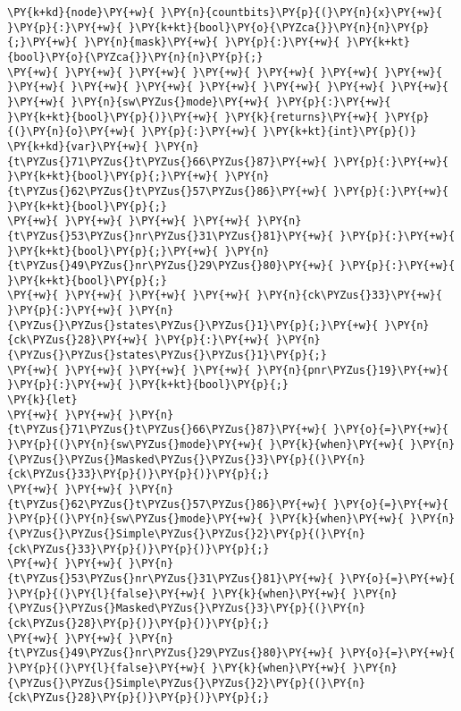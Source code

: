 \begin{Verbatim}[commandchars=\\\{\}]
\PY{k+kd}{node}\PY{+w}{ }\PY{n}{countbits}\PY{p}{(}\PY{n}{x}\PY{+w}{ }\PY{p}{:}\PY{+w}{ }\PY{k+kt}{bool}\PY{o}{\PYZca{}}\PY{n}{n}\PY{p}{;}\PY{+w}{ }\PY{n}{mask}\PY{+w}{ }\PY{p}{:}\PY{+w}{ }\PY{k+kt}{bool}\PY{o}{\PYZca{}}\PY{n}{n}\PY{p}{;}
\PY{+w}{ }\PY{+w}{ }\PY{+w}{ }\PY{+w}{ }\PY{+w}{ }\PY{+w}{ }\PY{+w}{ }\PY{+w}{ }\PY{+w}{ }\PY{+w}{ }\PY{+w}{ }\PY{+w}{ }\PY{+w}{ }\PY{+w}{ }\PY{+w}{ }\PY{n}{sw\PYZus{}mode}\PY{+w}{ }\PY{p}{:}\PY{+w}{ }\PY{k+kt}{bool}\PY{p}{)}\PY{+w}{ }\PY{k}{returns}\PY{+w}{ }\PY{p}{(}\PY{n}{o}\PY{+w}{ }\PY{p}{:}\PY{+w}{ }\PY{k+kt}{int}\PY{p}{)}
\PY{k+kd}{var}\PY{+w}{ }\PY{n}{t\PYZus{}71\PYZus{}t\PYZus{}66\PYZus{}87}\PY{+w}{ }\PY{p}{:}\PY{+w}{ }\PY{k+kt}{bool}\PY{p}{;}\PY{+w}{ }\PY{n}{t\PYZus{}62\PYZus{}t\PYZus{}57\PYZus{}86}\PY{+w}{ }\PY{p}{:}\PY{+w}{ }\PY{k+kt}{bool}\PY{p}{;}
\PY{+w}{ }\PY{+w}{ }\PY{+w}{ }\PY{+w}{ }\PY{n}{t\PYZus{}53\PYZus{}nr\PYZus{}31\PYZus{}81}\PY{+w}{ }\PY{p}{:}\PY{+w}{ }\PY{k+kt}{bool}\PY{p}{;}\PY{+w}{ }\PY{n}{t\PYZus{}49\PYZus{}nr\PYZus{}29\PYZus{}80}\PY{+w}{ }\PY{p}{:}\PY{+w}{ }\PY{k+kt}{bool}\PY{p}{;}
\PY{+w}{ }\PY{+w}{ }\PY{+w}{ }\PY{+w}{ }\PY{n}{ck\PYZus{}33}\PY{+w}{ }\PY{p}{:}\PY{+w}{ }\PY{n}{\PYZus{}\PYZus{}states\PYZus{}\PYZus{}1}\PY{p}{;}\PY{+w}{ }\PY{n}{ck\PYZus{}28}\PY{+w}{ }\PY{p}{:}\PY{+w}{ }\PY{n}{\PYZus{}\PYZus{}states\PYZus{}\PYZus{}1}\PY{p}{;}
\PY{+w}{ }\PY{+w}{ }\PY{+w}{ }\PY{+w}{ }\PY{n}{pnr\PYZus{}19}\PY{+w}{ }\PY{p}{:}\PY{+w}{ }\PY{k+kt}{bool}\PY{p}{;}
\PY{k}{let}
\PY{+w}{ }\PY{+w}{ }\PY{n}{t\PYZus{}71\PYZus{}t\PYZus{}66\PYZus{}87}\PY{+w}{ }\PY{o}{=}\PY{+w}{ }\PY{p}{(}\PY{n}{sw\PYZus{}mode}\PY{+w}{ }\PY{k}{when}\PY{+w}{ }\PY{n}{\PYZus{}\PYZus{}Masked\PYZus{}\PYZus{}3}\PY{p}{(}\PY{n}{ck\PYZus{}33}\PY{p}{)}\PY{p}{)}\PY{p}{;}
\PY{+w}{ }\PY{+w}{ }\PY{n}{t\PYZus{}62\PYZus{}t\PYZus{}57\PYZus{}86}\PY{+w}{ }\PY{o}{=}\PY{+w}{ }\PY{p}{(}\PY{n}{sw\PYZus{}mode}\PY{+w}{ }\PY{k}{when}\PY{+w}{ }\PY{n}{\PYZus{}\PYZus{}Simple\PYZus{}\PYZus{}2}\PY{p}{(}\PY{n}{ck\PYZus{}33}\PY{p}{)}\PY{p}{)}\PY{p}{;}
\PY{+w}{ }\PY{+w}{ }\PY{n}{t\PYZus{}53\PYZus{}nr\PYZus{}31\PYZus{}81}\PY{+w}{ }\PY{o}{=}\PY{+w}{ }\PY{p}{(}\PY{l}{false}\PY{+w}{ }\PY{k}{when}\PY{+w}{ }\PY{n}{\PYZus{}\PYZus{}Masked\PYZus{}\PYZus{}3}\PY{p}{(}\PY{n}{ck\PYZus{}28}\PY{p}{)}\PY{p}{)}\PY{p}{;}
\PY{+w}{ }\PY{+w}{ }\PY{n}{t\PYZus{}49\PYZus{}nr\PYZus{}29\PYZus{}80}\PY{+w}{ }\PY{o}{=}\PY{+w}{ }\PY{p}{(}\PY{l}{false}\PY{+w}{ }\PY{k}{when}\PY{+w}{ }\PY{n}{\PYZus{}\PYZus{}Simple\PYZus{}\PYZus{}2}\PY{p}{(}\PY{n}{ck\PYZus{}28}\PY{p}{)}\PY{p}{)}\PY{p}{;}

\end{Verbatim}
